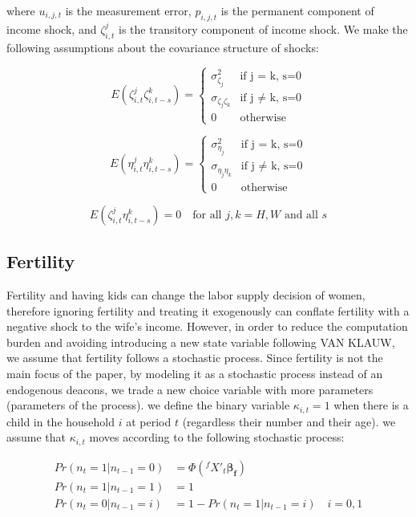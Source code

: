 where $u_{i,j,t}$ is the measurement error, $p_{i,j,t}$ is the permanent component of income shock, and $\zeta^j_{i,t}$ is the transitory component of income shock. We make the following assumptions about the covariance structure of shocks:

\begin{equation*}
E(\zeta^j_{i,t} \zeta^k_{i,t-s}) =
 \begin{cases}
\sigma^2_{\zeta_j} & \mbox{if j = k, s=0} \\
\sigma_{\zeta_j \zeta_k} & \mbox{if j $\neq$ k, s=0} \\
0 & \mbox{otherwise}
\end{cases}
\end{equation*}

\begin{equation*}
E(\eta^j_{i,t} \eta^k_{i,t-s}) = 
 \begin{cases}
\sigma^2_{\eta_j} & \mbox{if j = k, s=0} \\
\sigma_{\eta_j \eta_k} & \mbox{if j $\neq$ k, s=0} \\
0 & \mbox{otherwise}
\end{cases}
\end{equation*}

\begin{equation*}
E(\zeta^j_{i,t} \eta^k_{i,t-s}) = 0 \quad \text{for all $j,k = {H, W}$ and all $s$}
\end{equation*}

\subsection{Fertility}

Fertility and having kids can change the labor supply decision of women, therefore ignoring fertility and treating it exogenously can conflate fertility with a negative shock to the wife's income. However, in order to reduce the computation burden and avoiding introducing a new state variable following VAN KLAUW, we assume that fertility follows a stochastic process. Since fertility is not the main focus of the paper, by modeling it as a stochastic process  instead of an endogenous deacons, we trade a new choice variable with more parameters (parameters of the process). we define the binary variable $\kappa_{i,t} =1$ when there is a child in the household $i$ at period $t$ (regardless their number and their age). we assume that $\kappa_{i,t}$ moves according to the following stochastic process: 

\begin{align*}
Pr(n_t =1 | n_{t-1} =0) &= \Phi(^fX'_t \mathbf{\beta_f}) \\
Pr(n_t = 1 | n_{t-1} =1) &= 1 \\
Pr(n_t = 0 | n_{t-1} = i ) &= 1 - Pr(n_t =1 | n_{t-1} = i) \quad i = 0,1
\end{align*}

